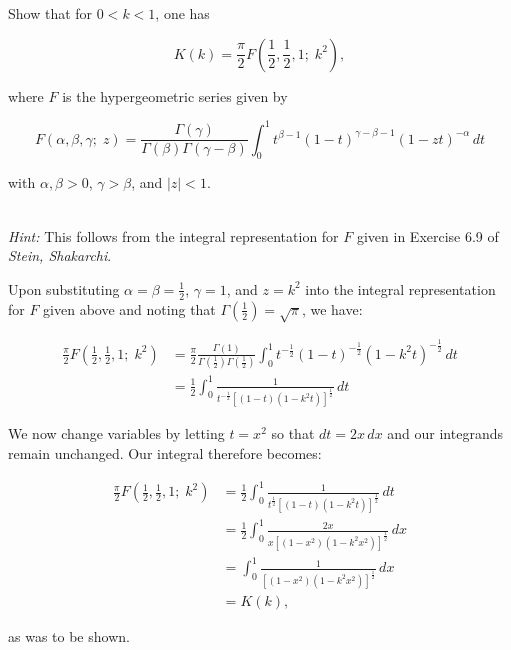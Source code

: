 Show that for $0 < k < 1$, one has

$$
K(k) = \frac{\pi}{2} F \left(\frac{1}{2}, \frac{1}{2}, 1; \; k^2 \right),
$$

where $F$ is the hypergeometric series given by

$$
F(\alpha, \beta, \gamma; \; z) = \frac{\Gamma(\gamma)}{\Gamma(\beta)\Gamma(\gamma - \beta)} 
                                 \int_0^1 t^{\beta - 1} (1 - t)^{\gamma - \beta - 1} (1 - zt)^{-\alpha} \, dt
$$

with $\alpha, \beta > 0$, $\gamma > \beta$, and $|z| < 1$. 

\ \\
\textit{Hint:} This follows from the integral representation for $F$ given in Exercise 6.9 of \textit{Stein, Shakarchi}.

\begin{solution}
  Upon substituting $\alpha = \beta = \frac{1}{2}$, $\gamma = 1$, and $z = k^2$ into the integral representation for $F$ 
  given above and noting that $\Gamma\left(\frac{1}{2}\right) = \sqrt{\pi}$, we have:

  \begin{align*}
  \frac{\pi}{2} F \left(\frac{1}{2}, \frac{1}{2}, 1; \; k^2 \right) 
    &= \frac{\pi}{2} \frac{\Gamma(1)}{\Gamma\left(\frac{1}{2}\right)\Gamma\left(\frac{1}{2}\right)} 
       \int_0^1 t^{-\frac{1}{2}} (1 - t)^{-\frac{1}{2}} (1 - k^2 t)^{-\frac{1}{2}} \, dt \\
    &= \frac{1}{2} \int_0^1 \frac{1}{t^{-\frac{1}{2}} \left[(1 - t)(1 - k^2 t)\right]^{\frac{1}{2}}} \, dt
  \end{align*}

  We now change variables by letting $t = x^2$ so that $dt = 2x \, dx$ and our integrands remain unchanged. Our 
  integral therefore becomes:

  \begin{align*}
  \frac{\pi}{2} F \left(\frac{1}{2}, \frac{1}{2}, 1; \; k^2 \right) 
    &= \frac{1}{2} \int_0^1 \frac{1}{t^{\frac{1}{2}} \left[(1 - t)(1 - k^2 t)\right]^{\frac{1}{2}}} \, dt \\
    &= \frac{1}{2} \int_0^1 \frac{2 x}{x \left[(1 - x^2)(1 - k^2 x^2)\right]^{\frac{1}{2}}} \, dx \\
    &= \int_0^1 \frac{1}{\left[(1 - x^2)(1 - k^2 x^2)\right]^{\frac{1}{2}}} \, dx \\
    &= K(k),
  \end{align*}

  as was to be shown.
  \ \\
\end{solution}
